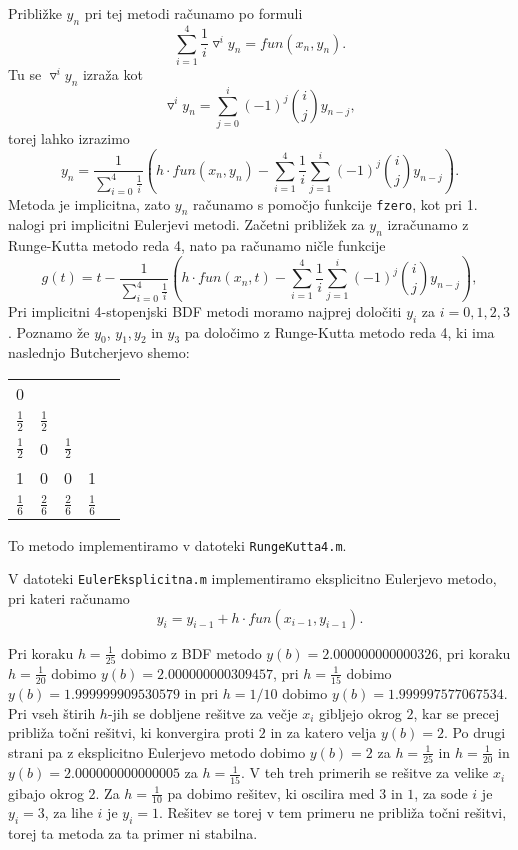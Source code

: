 \documentclass[a4paper,12pt]{article}
\begin{document}
Približke $y_n$ pri tej metodi računamo po formuli 
$$\sum_{i=1}^4 \frac{1}{i} \triangledown^i y_n = fun(x_n,y_n).$$
Tu se $\triangledown^i y_n$ izraža kot
$$\triangledown^i y_n = \sum_{j=0}^i (-1)^j {i\choose j} y_{n-j},$$
torej lahko izrazimo 
$$y_n = \frac{1}{\sum_{i=0}^4 \frac{1}{i}}(h\cdot fun(x_n,y_n)-
\sum_{i=1}^4 \frac{1}{i}\sum_{j=1}^i (-1)^j{i \choose j}y_{n-j}).$$
Metoda je implicitna, zato $y_n$ računamo s pomočjo funkcije \texttt{fzero}, 
kot pri 1. nalogi
pri implicitni Eulerjevi metodi. Začetni približek za $y_n$ izračunamo
z Runge-Kutta metodo reda 4, nato pa računamo ničle funkcije
$$g(t) =t- \frac{1}{\sum_{i=0}^4 \frac{1}{i}}(h\cdot fun(x_n,t)-
\sum_{i=1}^4 \frac{1}{i}\sum_{j=1}^i (-1)^j{i \choose j}y_{n-j}),$$
Pri implicitni 4-stopenjski BDF metodi moramo najprej določiti 
$y_i$ za $i=0,1,2,3$. Poznamo že $y_0$, $y_1, y_2$ in $y_3$ pa določimo
z Runge-Kutta metodo reda 4, ki ima naslednjo Butcherjevo shemo:
\begin{center}
    \begin{tabular}{c|cccc}
     0&  &  &  &  \\
     $\frac{1}{2}$ & $\frac{1}{2}$ &  &  &  \\
     $\frac{1}{2}$ & 0 & $\frac{1}{2}$ &  &  \\
     1 & 0 & 0 & 1 &  \\ \hline
     $\frac{1}{6}$ & $\frac{2}{6}$ & $\frac{2}{6}$ & $\frac{1}{6}$ & 
    \end{tabular}
\end{center}
To metodo implementiramo v datoteki \texttt{RungeKutta4.m}.

V datoteki \texttt{EulerEksplicitna.m} implementiramo eksplicitno Eulerjevo
metodo, pri kateri računamo
\[y_i=y_{i-1}+h\cdot fun(x_{i-1},y_{i-1}).\]

Pri koraku $h=\frac{1}{25}$ dobimo z BDF metodo $y(b)=2.000000000000326$,
pri koraku $h=\frac{1}{20}$ dobimo $y(b)=2.000000000309457$, pri $h=\frac{1}{15}$
dobimo $y(b)=1.999999909530579$ in pri $h=1/10$ dobimo $y(b)=1.999997577067534$. 
Pri vseh štirih $h$-jih se dobljene rešitve za večje $x_i$ gibljejo okrog $2$,
kar se precej približa točni rešitvi, ki konvergira proti $2$ in za katero velja
$y(b)=2$.
Po drugi strani pa z eksplicitno Eulerjevo metodo dobimo $y(b)=2$ za $h=\frac{1}{25}$
in $h=\frac{1}{20}$ in $y(b)=2.000000000000005$ za $h=\frac{1}{15}$. V teh treh
primerih se rešitve za velike $x_i$ gibajo okrog $2$. Za $h=\frac{1}{10}$ pa 
dobimo rešitev, ki oscilira med $3$ in $1$, za sode $i$ je $y_i=3$, za lihe
$i$ je $y_i=1$. Rešitev se torej v tem primeru ne približa točni rešitvi, 
torej ta metoda za ta primer ni stabilna.
\end{document}
